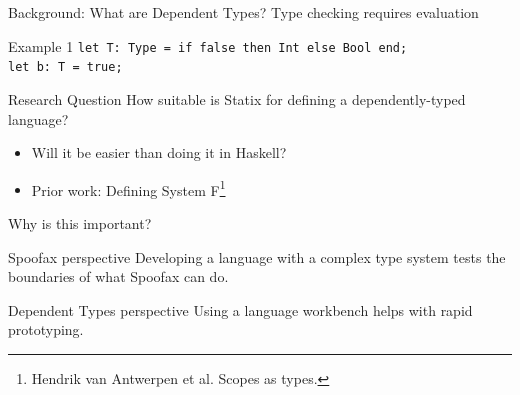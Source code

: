 \documentclass[aspectratio=43]{beamer}
\begin{document}
\begin{frame}[fragile]{Background: What are Dependent Types?}
	Type checking requires evaluation
	\begin{exampleblock}{Example 1}
		\texttt{let T: Type = if false then Int else Bool end;\\let b: T = true;}
	\end{exampleblock}
\end{frame}

\begin{frame}[fragile]{Research Question}
\large{How suitable is Statix for defining a dependently-typed language?}
\begin{itemize}
	\item Will it be easier than doing it in Haskell?
	\item Prior work: Defining System F\footnote{Hendrik van Antwerpen et al. Scopes as types.}
\end{itemize}

\end{frame}

\begin{frame}[fragile]{Why is this important?}
	\begin{block}{Spoofax perspective}
		Developing a language with a complex type system tests the boundaries of what Spoofax can do.
	\end{block}
	
	\begin{block}{Dependent Types perspective}
		Using a language workbench helps with rapid prototyping.
	\end{block}
\end{frame}
\end{document}
